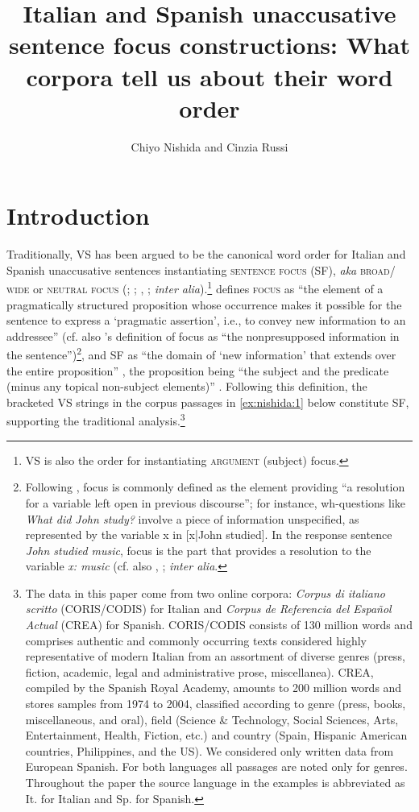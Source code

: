 \documentclass[output=paper,colorlinks,citecolor=brown,
]{langscibook}
\author{Chiyo Nishida\affiliation{University of Texas-Austin} and Cinzia Russi\affiliation{University of Texas-Austin}}
\title{Italian and Spanish unaccusative sentence focus constructions: What corpora tell us about
their word order}
\begin{document}
\maketitle

\section{Introduction}\label{sec:nishida:1}

Traditionally, VS has been argued to be the canonical word order for Italian and Spanish unaccusative sentences instantiating \textsc{sentence focus} (SF), \textit{aka}
\textsc{broad/}
\textsc{wide} or \textsc{neutral focus} (\citealt{contreras1976theory}; \citealt{lambrecht1994}; \citeyear{lambrecht2000subjects}, \citealt{gutierrez2007prominence}; \textit{inter alia}).\footnote{VS is also the order for instantiating \textsc{argument} (subject) focus.} \citet[612]{lambrecht2000subjects} defines \textsc{focus} as ``the element of a pragmatically structured proposition whose occurrence makes it possible for the sentence to express a `pragmatic assertion', i.e., to convey new information to an addressee'' (cf. also \citealt[27]{erteschik1999focus}'s definition of focus as ``the nonpresupposed information in the sentence'')\footnote{Following  \citet[74]{jackendoff1972}, focus is commonly defined  as the element providing 
``a resolution for a variable left open in previous discourse''; for instance, wh-questions like \textit{What did John study?} involve a piece of information unspecified, as represented by the variable x in [x|John studied].  In the response sentence \textit{John studied music}, focus is the part that provides a resolution to the variable \textit{x: music} (cf. also  \citealt{zubizarreta1998},  \citealt{lopez2009derivational}; \textit{inter alia}.}, and SF as 
``the domain of `new information' that extends over the entire proposition'' \citep[14]{lambrecht1994}, the proposition being ``the subject and the predicate (minus any topical non-subject elements)'' \citep[222]{lambrecht1994}. Following this definition, the bracketed VS strings in the corpus passages in \ref{ex:nishida:1} below constitute SF, supporting the traditional analysis.\footnote{The data in this paper come from two online corpora: \textit{Corpus di italiano scritto} (CORIS/CODIS) for Italian and \textit{Corpus de Referencia del Español Actual} (CREA) for Spanish. CORIS/CODIS consists of 130 million words and comprises authentic and commonly occurring texts considered highly representative of modern Italian from an assortment of diverse genres (press, fiction, academic, legal and administrative prose, miscellanea). CREA, compiled by the Spanish Royal Academy, amounts to 200 million words and stores samples from 1974 to 2004, classified according to genre (press, books, miscellaneous, and oral), field (Science \& Technology, Social Sciences, Arts, Entertainment, Health, Fiction, etc.) and country (Spain, Hispanic American countries, Philippines, and the US). We considered only written data from European Spanish. For both languages all passages are noted only for genres.  Throughout the paper the source language in the examples is abbreviated as It. for Italian and Sp. for Spanish.} 
\end{document}
